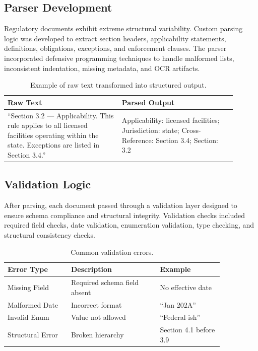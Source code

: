\documentclass[sigconf]{acmart}
\begin{document}
\subsection{Parser Development}

Regulatory documents exhibit extreme structural variability. Custom parsing logic was developed to extract section headers, applicability statements, definitions, obligations, exceptions, and enforcement clauses. The parser incorporated defensive programming techniques to handle malformed lists, inconsistent indentation, missing metadata, and OCR artifacts.

\begin{table}[h]
\centering
\begin{tabular}{p{0.45\linewidth} p{0.45\linewidth}}
\toprule
\textbf{Raw Text} & \textbf{Parsed Output} \\
\midrule
“Section 3.2 — Applicability. This rule applies to all licensed facilities operating within the state. Exceptions are listed in Section 3.4.” &
Applicability: licensed facilities; Jurisdiction: state; Cross-Reference: Section 3.4; Section: 3.2 \\
\bottomrule
\end{tabular}
\caption{Example of raw text transformed into structured output.}
\end{table}

\subsection{Validation Logic}

After parsing, each document passed through a validation layer designed to ensure schema compliance and structural integrity. Validation checks included required field checks, date validation, enumeration validation, type checking, and structural consistency checks.

\begin{table}[h]
\centering
\begin{tabular}{p{0.25\linewidth} p{0.35\linewidth} p{0.25\linewidth}}
\toprule
\textbf{Error Type} & \textbf{Description} & \textbf{Example} \\
\midrule
Missing Field & Required schema field absent & No effective date \\
Malformed Date & Incorrect format & “Jan 202A” \\
Invalid Enum & Value not allowed & “Federal-ish” \\
Structural Error & Broken hierarchy & Section 4.1 before 3.9 \\
\bottomrule
\end{tabular}
\caption{Common validation errors.}
\end{table}
\end{document}

